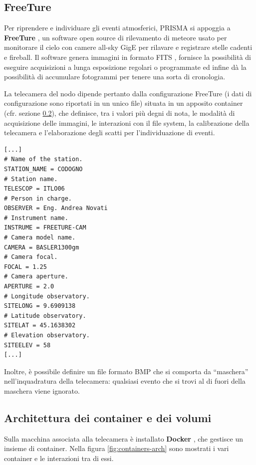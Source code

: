 \subsection{FreeTure} \label{freeture}

Per riprendere e individuare gli eventi atmosferici, PRISMA si appoggia a \textbf{FreeTure} \cite{FreeTure}, un software open source di rilevamento di meteore usato per monitorare il cielo con camere all-sky GigE per rilavare e registrare stelle cadenti e fireball.
Il software genera immagini in formato FITS \cite{FITS}, fornisce la possibilità di eseguire acquisizioni a lunga esposizione regolari o programmate ed infine dà la possibilità di accumulare fotogrammi per tenere una sorta di cronologia. 

La telecamera del nodo dipende pertanto dalla configurazione FreeTure (i dati di configurazione sono riportati in un unico file) situata in un apposito container (cfr. sezione \ref{docker}), che definisce, tra i valori più degni di nota, le modalità di acquisizione delle immagini, le interazioni con il file system, la calibrazione della telecamera e l'elaborazione degli scatti per l'individuazione di eventi.

\begin{lstlisting}[style=PHP,caption={Parte della configurazione FreeTure che risiede sul nodo di Codogno.},captionpos=b]
[...]
# Name of the station.
STATION_NAME = CODOGNO	
# Station name.
TELESCOP = ITLO06
# Person in charge.
OBSERVER = Eng. Andrea Novati
# Instrument name.
INSTRUME = FREETURE-CAM
# Camera model name.
CAMERA = BASLER1300gm
# Camera focal.
FOCAL = 1.25
# Camera aperture.
APERTURE = 2.0
# Longitude observatory.
SITELONG = 9.6909138
# Latitude observatory.
SITELAT = 45.1638302
# Elevation observatory.
SITEELEV = 58
[...]
\end{lstlisting}

Inoltre, è possibile definire un file formato BMP che si comporta da “maschera” nell'inquadratura della telecamera: qualsiasi evento che si trovi al di fuori della maschera viene ignorato.

\subsection{Architettura dei container e dei volumi} \label{docker}

Sulla macchina associata alla telecamera è installato \textbf{Docker} \cite{Docker}, che gestisce un insieme di container. Nella figura \ref{fig:containers-arch} sono mostrati i vari container e le interazioni tra di essi. 

